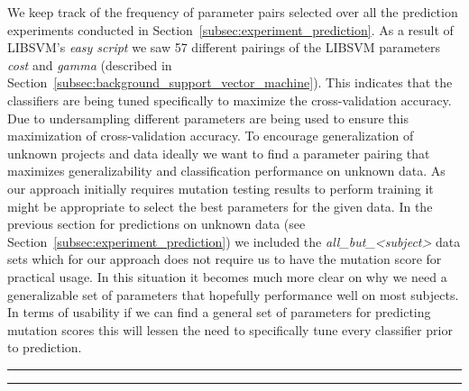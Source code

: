 \noindent
We keep track of the frequency of parameter pairs selected over all the prediction experiments conducted in Section~\ref{subsec:experiment_prediction}. As a result of LIBSVM's \emph{easy script} we saw 57 different pairings of the LIBSVM parameters \emph{cost} and \emph{gamma} (described in Section~\ref{subsec:background_support_vector_machine}). This indicates that the classifiers are being tuned specifically to maximize the cross-validation accuracy. Due to undersampling different parameters are being used to ensure this maximization of cross-validation accuracy. To encourage generalization of unknown projects and data ideally we want to find a parameter pairing that maximizes generalizability and classification performance on unknown data. As our approach initially requires mutation testing results to perform training it might be appropriate to select the best parameters for the given data. In the previous section for predictions on unknown data (see Section~\ref{subsec:experiment_prediction}) we included the \emph{all\_but\_<subject>} data sets which for our approach does not require us to have the mutation score for practical usage. In this situation it becomes much more clear on why we need a generalizable set of parameters that hopefully performance well on most subjects. In terms of usability if we can find a general set of parameters for predicting mutation scores this will lessen the need to specifically tune every classifier prior to prediction.

\begin{sidewaysfigure}[h]
  \centering

  \vspace{2mm}
  \hrule
	\vspace{3em}

  \centering
  \vspace{2mm}
  \hrule
\end{sidewaysfigure}

